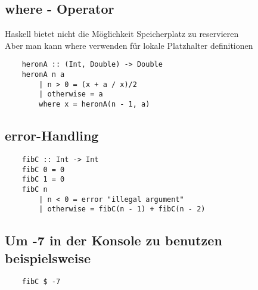 \documentclass[a4paper]{article}
\begin{document}
\subsection{where - Operator}
Haskell bietet nicht die Möglichkeit Speicherplatz zu reservieren \\
Aber man kann where verwenden für lokale Platzhalter definitionen

\begin{verbatim}
    heronA :: (Int, Double) -> Double
    heronA n a
        | n > 0 = (x + a / x)/2
        | otherwise = a
        where x = heronA(n - 1, a)
\end{verbatim}

\subsection{error-Handling}
\begin{verbatim}
    fibC :: Int -> Int
    fibC 0 = 0
    fibC 1 = 0
    fibC n
        | n < 0 = error "illegal argument"
        | otherwise = fibC(n - 1) + fibC(n - 2)
\end{verbatim}

\subsection{Um -7 in der Konsole zu benutzen beispielsweise}
\begin{verbatim}
    fibC $ -7
\end{verbatim}
\end{document}
